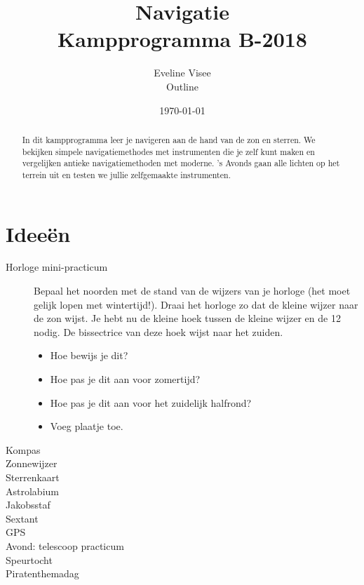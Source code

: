 \documentclass[a4paper,10pt]{article}
\title{Navigatie \\ Kampprogramma B-2018}
\author{Eveline Visee \\ Outline}
\date{\today}
\begin{document}
\maketitle

\begin{abstract}
In dit kampprogramma leer je navigeren aan de hand van de zon en sterren. We bekijken simpele navigatiemethodes met instrumenten die je zelf kunt maken en vergelijken antieke navigatiemethoden met moderne. 's Avonds gaan alle lichten op het terrein uit en testen we jullie zelfgemaakte instrumenten. 
\end{abstract}

\section{Idee\"{e}n}
\begin{description}
 \item [Horloge mini-practicum] Bepaal het noorden met de stand van de wijzers van je horloge (het moet gelijk lopen met wintertijd!). Draai het horloge zo dat de kleine wijzer naar de zon wijst. Je hebt nu de kleine hoek tussen de kleine wijzer en de 12 nodig. De bissectrice van deze hoek wijst naar het zuiden. 
 \begin{itemize}
  \item Hoe bewijs je dit?
  \item Hoe pas je dit aan voor zomertijd?
  \item Hoe pas je dit aan voor het zuidelijk halfrond?
  \item Voeg plaatje toe.
 \end{itemize}
 \item [Kompas]
 \item [Zonnewijzer]
 \item [Sterrenkaart]
 \item [Astrolabium]
 \item [Jakobsstaf]
 \item [Sextant]
 \item [GPS]
 \item [Avond: telescoop practicum]
 \item [Speurtocht]
 \item [Piratenthemadag]
\end{description}
\end{document}
